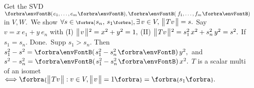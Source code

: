 Get the SVD $\Par{e_1,\dots,e_m},\Par{\,f_1,\dots,f_m}$ in $V,W.$ \,We show $\forall s\in\Interval{[}{]}{s_n,\,s_1},\exists\,v\in V,\,\Dvert{Tv}=s.$\vspace{1pt}\parSol{}
Say $v=x\:\!e_1+y\:\!e_n$ with (I) $\big\Vert\hspace{1pt}{}v{}\hspace{1pt}\big\Vert{\hspace{0.5pt}}{^2}=x^2+y^2=1,$ (II) $\big\Vert\hspace{1pt}{}Tv{}\hspace{1pt}\big\Vert{\hspace{0.5pt}}{^2}=s_1^2\,x^2+s_n^2\,y^2=s^2.$\vspace{1pt}\parSol{}
If $s_1=s_n.$ Done. \,Supp $s_1>s_n.$ Then \,$s_1^2-s^2=\Par{s_1^2-s_n^2}\,y^2,$ \,and \:$s^2-s_n^2=\Par{s_1^2-s_n^2}\,x^2.$\PfEnd\vspace{3pt}
\AComm $T$ is a scalar multi of an isomet $\Longleftrightarrow\Bra{\Dvert{Tv}:v\in V,\Dvert{v}=1}=\Bra{s_1}.$
\SepLine



